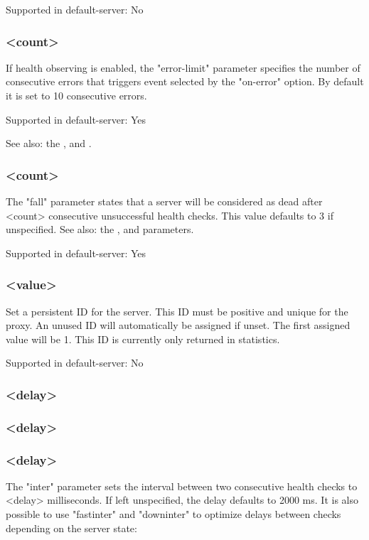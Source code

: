   Supported in default-server: No

\subsubsection[error-limit]{ <count>}
  If health observing is enabled, the "error-limit" parameter specifies the
  number of consecutive errors that triggers event selected by the "on-error"
  option. By default it is set to 10 consecutive errors.

  Supported in default-server: Yes


See also: the ,  and .

\subsubsection[fall]{ <count>}
  The "fall" parameter states that a server will be considered as dead after
  <count> consecutive unsuccessful health checks. This value defaults to 3 if
  unspecified.
See also: the ,  and  parameters.

  Supported in default-server: Yes

\subsubsection[id]{ <value>}
  Set a persistent ID for the server. This ID must be positive and unique for
  the proxy. An unused ID will automatically be assigned if unset. The first
  assigned value will be 1. This ID is currently only returned in statistics.

  Supported in default-server: No

\subsubsection[inter]{ <delay>}
\subsubsection[fastinter]{ <delay>}
\subsubsection[downinter]{ <delay>}
  The "inter" parameter sets the interval between two consecutive health checks
  to <delay> milliseconds. If left unspecified, the delay defaults to 2000 ms.
  It is also possible to use "fastinter" and "downinter" to optimize delays
  between checks depending on the server state:

